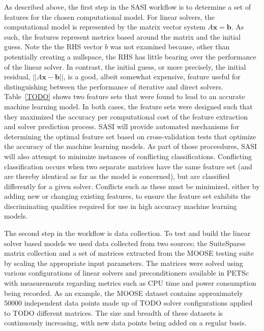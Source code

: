 As described above, the first step in the SASI workflow is to determine a set of features for the chosen computational model. For linear solvers, the computational model is represented by the matrix vector system $A\mathbf{x} = \mathbf{b}$. As such, the features represent metrics based around the matrix and the initial guess. Note the the RHS vector $b$ was not examined because, other than potentially creating a nullspace, the RHS has little bearing over the performance of the linear solver. In contrast, the initial guess, or more precisely, the initial residual, $||A\mathbf{x}-\mathbf{b}||$, is a good, albeit somewhat expensive, feature useful for distinguishing between the performance of iterative and direct solvers. Table~\ref{TODO} shows two feature sets that were found to lead to an accurate machine learning model. In both cases, the feature sets were designed such that they maximized the accuracy per computational cost of the feature extraction and solver prediction process. SASI will provide automated mechanisms for determining the optimal feature set based on cross-validation tests that optimize the accuracy of the machine learning models. As part of those proceedures, SASI will also attempt to minimize instances of conflicting classifications. Conflicting classification occurs when two separate matrices have the same feature set (and are thereby identical as far as the model is concerned), but are classified differently for a given solver. Conflicts such as these must be minimized, either by adding new or changing existing features,  to ensure the feature set exhibits the discriminating qualities required for use in high accuracy machine learning models. 

The second step in the workflow is data collection. To test and build the linear solver based models we used data collected from two sources; the SuiteSparse matrix collection and a set of matrices extracted from the MOOSE testing suite by scaling the appropriate input parameters. The matrices were solved using various configurations of linear solvers and preconditioners available in PETSc with measurements regarding metrics such as CPU time and power consumption being recorded. As an example, the MOOSE dataset contains approximately 50000 independent data points made up of TODO solver configurations applied to TODO different matrices. The size and breadth of these datasets is continuously increasing, with new data points being added on a regular basis. 

